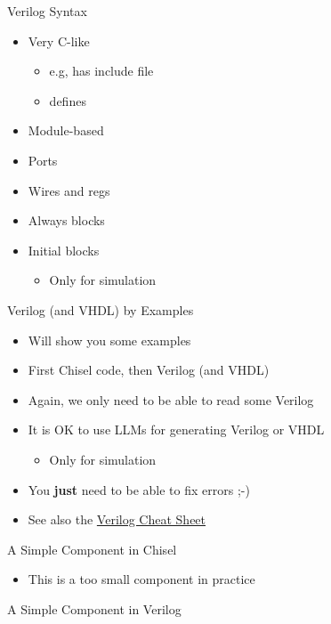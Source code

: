 \begin{frame}[fragile]{Verilog Syntax}
\begin{itemize}
\item Very C-like
\begin{itemize}
\item e.g, has include file
\item defines
\end{itemize}
\item Module-based
\item Ports
\item Wires and regs
\item Always blocks
\item Initial blocks
\begin{itemize}
\item Only for simulation
\end{itemize}
\end{itemize}
\end{frame}

\begin{frame}[fragile]{Verilog (and VHDL) by Examples}
\begin{itemize}
\item Will show you some examples
\item First Chisel code, then Verilog (and VHDL)
\item Again, we only need to be able to read some Verilog
\item It is OK to use LLMs for generating Verilog or VHDL
\begin{itemize}
\item Only for simulation
\end{itemize}
\item You {\bf just} need to be able to fix errors ;-)
\item See also the \href{https://marceluda.github.io/rp_dummy/EEOF2018/Verilog_Cheat_Sheet.pdf}{Verilog Cheat Sheet}
\end{itemize}
\end{frame}

\begin{frame}[fragile]{A Simple Component in Chisel}
\begin{itemize}
\item This is a too small component in practice
\end{itemize}
\end{frame}


\begin{frame}[fragile]{A Simple Component in Verilog}
\end{frame}

